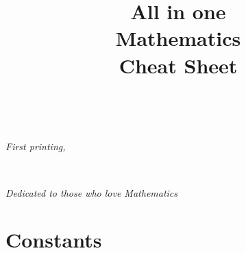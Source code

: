 \documentclass{tufte-book}
\title{All in one\\ Mathematics\\\quad Cheat Sheet}
\begin{document}
\frontmatter

\maketitle

\newpage

\begin{fullwidth}
~\vfill
\thispagestyle{empty}
\setlength{\parindent}{0pt}
\setlength{\parskip}{\baselineskip}


\par{}

\par\textit{First printing, \monthyear}
\end{fullwidth}

\tableofcontents

\listoffigures
\listoftables


\cleardoublepage
~\vfill
\begin{doublespace}
\noindent\fontsize{18}{22}\selectfont\itshape
\nohyphenation
Dedicated to those who love Mathematics
\end{doublespace}
\vfill
\vfill

\cleardoublepage

\chapter{Constants}
\end{document}
